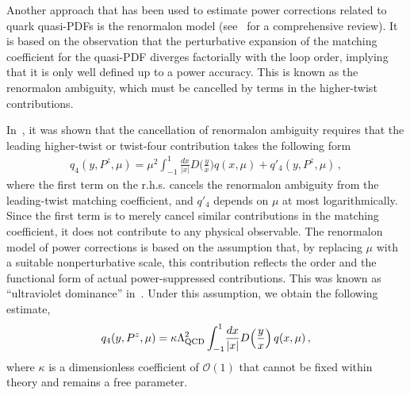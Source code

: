 \documentclass[aps,rmp,reprint,amsmath,amssymb,graphicx,longbibliography]{revtex4-1} %
\begin{document}
Another approach that has been used to estimate power corrections related to quark quasi-PDFs is the
renormalon model (see~\cite{Beneke:1998ui} for a comprehensive review).
%
It is based on the observation that the perturbative expansion of the matching coefficient for the quasi-PDF diverges factorially with the loop order, implying that it is only well defined up to a power accuracy. This is known as the renormalon ambiguity, which must be cancelled by terms in the higher-twist contributions.


In~\cite{Braun:2018brg}, it was shown that the cancellation of renormalon ambiguity requires that the leading higher-twist or twist-four contribution takes the following form
\begin{align}
	\label{eq:Q4-cutoff}
	{q}_4(y,P^z,\mu) = \mu^2 \int_{-1}^1 \!\frac{dx}{|x|} D\Big(\frac{y}{x}\Big) q(x,\mu) + q'_4(y,P^z,\mu)\,,
\end{align}
where the first term on the r.h.s. cancels the renormalon ambiguity from the leading-twist matching coefficient, and $q'_4$ depends on $\mu$ at most logarithmically. Since the first term is to merely cancel similar contributions in the matching coefficient, it does not contribute to any physical observable. The renormalon model of power corrections \cite{Beneke:1995pq,Dokshitzer:1995qm,Dasgupta:1996hh,Dasgupta:1996ki,Beneke:1997sr,Braun:2004bu} is based on the assumption that, by replacing $\mu$ with a suitable nonperturbative scale, this contribution reflects the order and the functional form of actual power-suppressed contributions. This was known as ``ultraviolet dominance'' in~\cite{Braun:1995tp,Beneke:1998ui,Beneke:2000kc}. Under this assumption, we obtain the following estimate,
\begin{equation}
	{q}_4(y,P^z,\mu) = \kappa
	\Lambda_{\rm QCD}^2 \int_{-1}^1 \!\frac{dx}{|x|} D\Big(\frac{y}{x}\Big)\, q(x,\mu)\,,
	\label{UV_Lambda_int}
\end{equation}
where $\kappa$ is a dimensionless coefficient of $\mathcal O(1)$ that cannot be fixed within theory and remains a free parameter.
\end{document}

